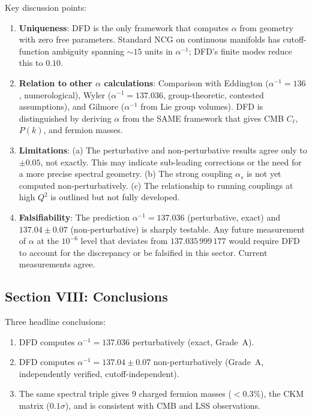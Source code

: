 \documentclass[11pt,a4paper]{article}
\begin{document}
Key discussion points:
\begin{enumerate}
\item \textbf{Uniqueness}: DFD is the only framework that computes $\alpha$ from geometry with zero free parameters. Standard NCG on continuous manifolds has cutoff-function ambiguity spanning $\sim 15$ units in $\alpha^{-1}$; DFD's finite modes reduce this to $0.10$.

\item \textbf{Relation to other $\alpha$ calculations}: Comparison with Eddington ($\alpha^{-1} = 136$, numerological), Wyler ($\alpha^{-1} = 137.036$, group-theoretic, contested assumptions), and Gilmore ($\alpha^{-1}$ from Lie group volumes). DFD is distinguished by deriving $\alpha$ from the SAME framework that gives CMB $C_\ell$, $P(k)$, and fermion masses.

\item \textbf{Limitations}: (a) The perturbative and non-perturbative results agree only to $\pm 0.05$, not exactly. This may indicate sub-leading corrections or the need for a more precise spectral geometry. (b) The strong coupling $\alpha_s$ is not yet computed non-perturbatively. (c) The relationship to running couplings at high $Q^2$ is outlined but not fully developed.

\item \textbf{Falsifiability}: The prediction $\alpha^{-1} = 137.036$ (perturbative, exact) and $137.04 \pm 0.07$ (non-perturbative) is sharply testable. Any future measurement of $\alpha$ at the $10^{-6}$ level that deviates from $137.035\,999\,177$ would require DFD to account for the discrepancy or be falsified in this sector. Current measurements agree.
\end{enumerate}

\subsection{Section VIII: Conclusions}

Three headline conclusions:
\begin{enumerate}
\item DFD computes $\alpha^{-1} = 137.036$ perturbatively (exact, Grade~A).
\item DFD computes $\alpha^{-1} = 137.04 \pm 0.07$ non-perturbatively (Grade~A, independently verified, cutoff-independent).
\item The same spectral triple gives 9 charged fermion masses ($< 0.3\%$), the CKM matrix ($0.1\sigma$), and is consistent with CMB and LSS observations.
\end{enumerate}
\end{document}
